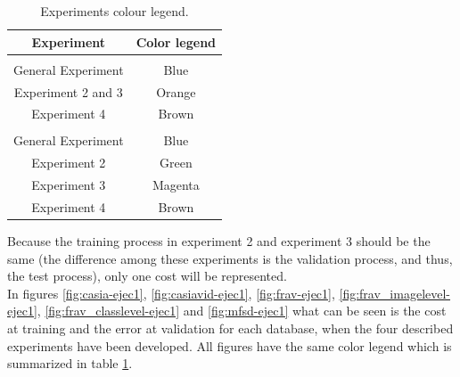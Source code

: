\begin{table}[t]
\centering
\begin{tabular}{|c|c|}
\hline
\rowcolor[HTML]{ECF4FF}
\textbf{Experiment}           & \textbf{Color legend}          \\ \hline
\rowcolor[HTML]{ECF4FF}
\multicolumn{2}{|c|}{\cellcolor[HTML]{ECF4FF}Training cost}    \\ \hline
General Experiment            & Blue                           \\ \hline
Experiment 2 and 3            & Orange                         \\ \hline
Experiment 4                  & Brown                          \\ \hline
\rowcolor[HTML]{ECF4FF}
\multicolumn{2}{|c|}{\cellcolor[HTML]{ECF4FF}Validation Error} \\ \hline
General Experiment            & Blue                           \\ \hline
Experiment 2                  & Green                          \\ \hline
Experiment 3                  & Magenta                        \\ \hline
Experiment 4                  & Brown                          \\ \hline
\end{tabular}
\caption{Experiments colour legend.}
\label{table:color_legend}
\end{table}
Because the training process in experiment 2 and experiment 3 should be the same (the difference among these experiments is the validation process, and thus, the test process), only one cost will be represented.\\

In figures \ref{fig:casia-ejec1}, \ref{fig:casiavid-ejec1}, \ref{fig:frav-ejec1}, \ref{fig:frav_imagelevel-ejec1}, \ref{fig:frav_classlevel-ejec1} and \ref{fig:mfsd-ejec1} what can be seen is the cost at training and the error at validation for each database, when the four described experiments have been developed. All figures have the same color legend which is summarized in table \ref{table:color_legend}.\\



